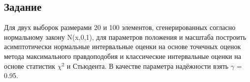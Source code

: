 \subsection{Задание}
Для двух выборок размерами 20 и 100 элементов, сгенерированных согласно нормальному закону N(x,0,1), для параметров положения и масштаба построить асимптотически нормальные интервальные оценки на основе точечных оценок метода максимального правдоподобия и классические интервальные оценки на основе статистик $\chi^{2}$ и Стьюдента. В качестве параметра надёжности взять $\gamma$ = 0.95.